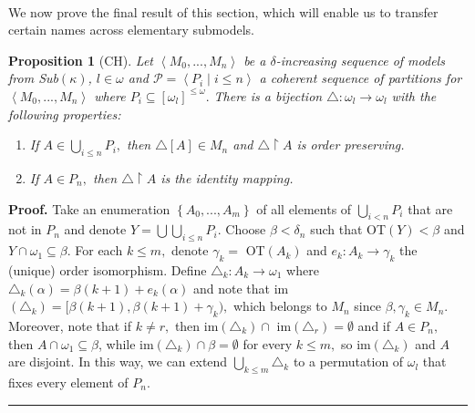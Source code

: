 \documentclass{article}%
\newtheorem{proposition}[theorem]{Proposition}
\newenvironment{proof}[1][Proof]{\noindent\textbf{#1.} }{\ \rule{0.5em}{0.5em}}
\begin{document}
\qquad\ \ \qquad\ \ 

We now prove the final result of this section, which will enable us to
transfer certain names across elementary submodels.

\begin{proposition}
[\textsf{CH}]Let $\left\langle M_{0},...,M_{n}\right\rangle $ be a $\delta
$-increasing sequence of models from \textsf{Sub}$\left(  \kappa\right)  $,
$l\in\omega$ and $\mathcal{P}=\left\langle P_{i}\mid i\leq n\right\rangle $ a
coherent sequence of partitions for $\left\langle M_{0},...,M_{n}\right\rangle
$ where $P_{i}\subseteq\left[  \omega_{l}\right]  ^{\leq\omega}.$ There is a
bijection $\triangle:\omega_{l}\longrightarrow\omega_{l}$ with the following
properties: \label{prop permutacion}

\begin{enumerate}
\item If $A\in%
{\textstyle\bigcup\limits_{i\leq n}}
P_{i},$ then $\triangle\left[  A\right]  \in M_{n}$ and $\triangle
\upharpoonright A$ is order preserving.

\item If $A\in P_{n},$ then $\triangle\upharpoonright A$ is the identity mapping.
\end{enumerate}
\end{proposition}

\begin{proof}
Take an enumeration $\left\{  A_{0},...,A_{m}\right\}  $ of all elements of $%
{\textstyle\bigcup\limits_{i<n}}
P_{i}$ that are not in $P_{n}$ and denote $Y=%
{\textstyle\bigcup}
{\textstyle\bigcup\limits_{i\leq n}}
P_{i}.$ Choose $\beta<\delta_{n}$ such that \textsf{OT}$\left(  Y\right)
<\beta$ and $Y\cap\omega_{1}\subseteq\beta.$ For each $k\leq m,$ denote
$\gamma_{k}=$ \textsf{OT}$\left(  A_{k}\right)  $ and $e_{k}:A_{k}%
\longrightarrow\gamma_{k}$ the (unique) order isomorphism. Define
$\triangle_{k}:A_{k}\longrightarrow\omega_{1}$ where $\triangle_{k}\left(
\alpha\right)  =\beta\left(  k+1\right)  +e_{k}\left(  \alpha\right)  $ and
note that \textsf{im}$\left(  \triangle_{k}\right)  =[\beta\left(  k+1\right)
,\beta\left(  k+1\right)  +\gamma_{k}),$ which belongs to $M_{n}$ since
$\beta,\gamma_{k}\in M_{n}.$ Moreover, note that if $k\neq r,$ then
\textsf{im}$\left(  \triangle_{k}\right)  \cap$ \textsf{im}$\left(
\triangle_{r}\right)  =\emptyset$ and if $A\in P_{n},$ then $A\cap\omega
_{1}\subseteq\beta$, while \textsf{im}$\left(  \triangle_{k}\right)  \cap
\beta=\emptyset$ for every $k\leq m,$ so \textsf{im}$\left(  \triangle
_{k}\right)  $ and $A$ are disjoint. In this way, we can extend $%
{\textstyle\bigcup\limits_{k\leq m}}
\triangle_{k}$ to a permutation of $\omega_{l}$ that fixes every element of
$P_{n}.$
\end{proof}
\end{document}
